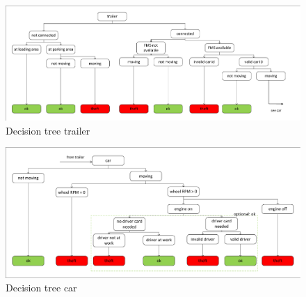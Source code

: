 \begin{figure} [h]
    \includegraphics[clip, trim=0.1cm 0.1cm 0.1cm 0.1cm, width=1\textwidth]{src/pic/DecisionTreeTrailer}
    \caption{Decision tree trailer}
    \label{DecisionTreeTrailer}
\end{figure}

\begin{figure} [h]
    \includegraphics[clip, trim=0.1cm 0.1cm 0.1cm 0.1cm, width=1\textwidth]{src/pic/DecisionTreeCar}
    \caption{Decision tree car}
    \label{DecisionTreeCar}
\end{figure}


\clearpage